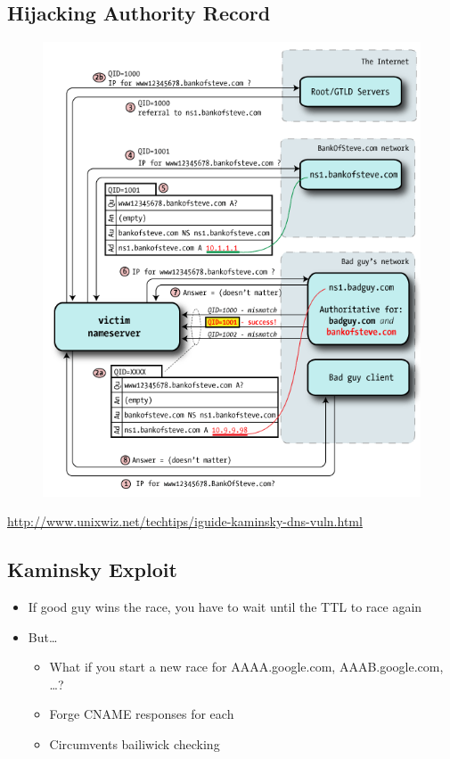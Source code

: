 \subsection{Hijacking Authority Record}
\begin{figure}[H]
    \includegraphics[scale=0.5]{lazy/hijacking.png}
\end{figure}
\url{http://www.unixwiz.net/techtips/iguide-kaminsky-dns-vuln.html}
\subsection{Kaminsky Exploit}
\begin{itemize}[nosep]
    \item If good guy wins the race, you have to wait until the TTL to race again
    \item But\dots
          \begin{itemize}[nosep]
              \item What if you start a new race for AAAA.google.com, AAAB.google.com, \dots?
              \item Forge CNAME responses for each
              \item Circumvents bailiwick checking
          \end{itemize}
\end{itemize}

